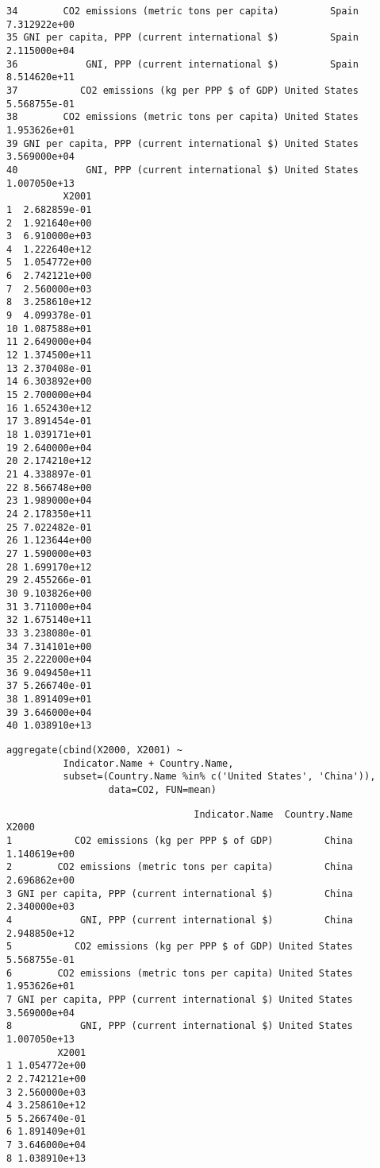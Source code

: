 \documentclass[xcolor={usenames,svgnames,dvipsnames}]{beamer}
\begin{document}
\begin{frame}[fragile]
\begin{verbatim}
34        CO2 emissions (metric tons per capita)         Spain 7.312922e+00
35 GNI per capita, PPP (current international $)         Spain 2.115000e+04
36            GNI, PPP (current international $)         Spain 8.514620e+11
37           CO2 emissions (kg per PPP $ of GDP) United States 5.568755e-01
38        CO2 emissions (metric tons per capita) United States 1.953626e+01
39 GNI per capita, PPP (current international $) United States 3.569000e+04
40            GNI, PPP (current international $) United States 1.007050e+13
          X2001
1  2.682859e-01
2  1.921640e+00
3  6.910000e+03
4  1.222640e+12
5  1.054772e+00
6  2.742121e+00
7  2.560000e+03
8  3.258610e+12
9  4.099378e-01
10 1.087588e+01
11 2.649000e+04
12 1.374500e+11
13 2.370408e-01
14 6.303892e+00
15 2.700000e+04
16 1.652430e+12
17 3.891454e-01
18 1.039171e+01
19 2.640000e+04
20 2.174210e+12
21 4.338897e-01
22 8.566748e+00
23 1.989000e+04
24 2.178350e+11
25 7.022482e-01
26 1.123644e+00
27 1.590000e+03
28 1.699170e+12
29 2.455266e-01
30 9.103826e+00
31 3.711000e+04
32 1.675140e+11
33 3.238080e-01
34 7.314101e+00
35 2.222000e+04
36 9.049450e+11
37 5.266740e-01
38 1.891409e+01
39 3.646000e+04
40 1.038910e+13
\end{verbatim}


\lstset{language=R}
\begin{lstlisting}
aggregate(cbind(X2000, X2001) ~
          Indicator.Name + Country.Name,
          subset=(Country.Name %in% c('United States', 'China')),
                  data=CO2, FUN=mean)
\end{lstlisting}


\begin{verbatim}
                                 Indicator.Name  Country.Name        X2000
1           CO2 emissions (kg per PPP $ of GDP)         China 1.140619e+00
2        CO2 emissions (metric tons per capita)         China 2.696862e+00
3 GNI per capita, PPP (current international $)         China 2.340000e+03
4            GNI, PPP (current international $)         China 2.948850e+12
5           CO2 emissions (kg per PPP $ of GDP) United States 5.568755e-01
6        CO2 emissions (metric tons per capita) United States 1.953626e+01
7 GNI per capita, PPP (current international $) United States 3.569000e+04
8            GNI, PPP (current international $) United States 1.007050e+13
         X2001
1 1.054772e+00
2 2.742121e+00
3 2.560000e+03
4 3.258610e+12
5 5.266740e-01
6 1.891409e+01
7 3.646000e+04
8 1.038910e+13
\end{verbatim}
\end{frame}
\end{document}
